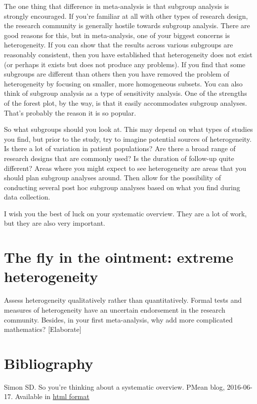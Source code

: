\documentclass[
  letterpaper,
  DIV=11,
  numbers=noendperiod]{scrreprt}
\begin{document}
\begin{tcolorbox}
The one thing that difference in meta-analysis is that subgroup analysis
is strongly encouraged. If you're familiar at all with other types of
research design, the research community is generally hostile towards
subgroup analysis. There are good reasons for this, but in
meta-analysis, one of your biggest concerns is heterogeneity. If you can
show that the results across various subgroups are reasonably
consistent, then you have established that heterogeneity does not exist
(or perhaps it exists but does not produce any problems). If you find
that some subgroups are different than others then you have removed the
problem of heterogeneity by focusing on smaller, more homogeneous
subsets. You can also think of subgroup analysis as a type of
sensitivity analysis. One of the strengths of the forest plot, by the
way, is that it easily accommodates subgroup analyses. That's probably
the reason it is so popular.

So what subgroups should you look at. This may depend on what types of
studies you find, but prior to the study, try to imagine potential
sources of heterogeneity. Is there a lot of variation in patient
populations? Are there a broad range of research designs that are
commonly used? Is the duration of follow-up quite different? Areas where
you might expect to see heterogeneity are areas that you should plan
subgroup analyses around. Then allow for the possibility of conducting
several post hoc subgroup analyses based on what you find during data
collection.

I wish you the best of luck on your systematic overview. They are a lot
of work, but they are also very important.

\section{The fly in the ointment: extreme
heterogeneity}\label{the-fly-in-the-ointment-extreme-heterogeneity}

Assess heterogeneity qualitatively rather than quantitatively. Formal
tests and measures of heterogeneity have an uncertain endorsement in the
research community. Besides, in your first meta-analysis, why add more
complicated mathematics? {[}Elaborate{]}

\section{Bibliography}\label{bibliography-15}

Simon SD. So you're thinking about a systematic overview. PMean blog,
2016-06-17. Available in
\href{http://pmean.com/posts/systematic-overview/}{html format}


\end{tcolorbox}
\end{document}

